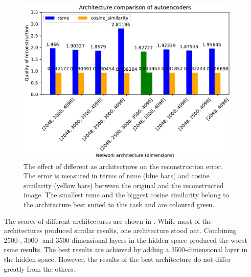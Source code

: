 \begin{figure}[!htb] %
    \centering
    \includegraphics[width=1\textwidth]{images/embeddings/autoencoder/ae_score_plot.pdf}
    \caption[Different \ac{ae} architectures and their reconstruction error]{The effect of different \ac{ae} architectures on the reconstruction error.
    The error is measured in terms of \ac{rsme} (blue bars) and cosine similarity (yellow bars) between the original and the reconstructed image.
    The smallest \ac{rsme} and the biggest cosine similarity belong to the architecture best suited to this task and are coloured green.
    }
    \label{fig:eval-ae-architecture}
\end{figure}

The scores of different architectures are shown in .
While most of the architectures produced similar results, one architecture stood out.
Combining 2500-, 3000- and 3500-dimensional layers in the hidden space produced the worst \ac{rsme} results.
The best results are achieved by adding a 3500-dimensional layer in the hidden space.
However, the results of the best architecture do not differ greatly from the others.
